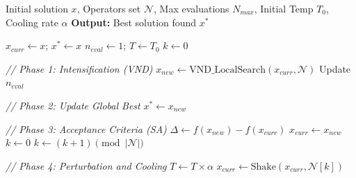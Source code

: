 \documentclass[preprint,12pt,authoryear]{elsarticle}
\begin{document}
\begin{algorithm}
    \caption{Hybrid VNS with SA Acceptance}
    \label{algoVNS}
    \begin{algorithmic}[1]
    \Require Initial solution $x$, Operators set $\mathcal{N}$, Max evaluations $N_{max}$, Initial Temp $T_0$, Cooling rate $\alpha$
    \State \textbf{Output:} Best solution found $x^*$
    
    \State $x_{curr} \leftarrow x$; \quad $x^* \leftarrow x$
    \State $n_{eval} \leftarrow 1$; \quad $T \leftarrow T_0$
    \State $k \leftarrow 0$ 

        
        \State \textit{// Phase 1: Intensification (VND)}
        \State $x_{new} \leftarrow \text{VND\_LocalSearch}(x_{curr}, \mathcal{N})$ 
        \State Update $n_{eval}$
        
        \State \textit{// Phase 2: Update Global Best}
            \State $x^* \leftarrow x_{new}$
        \EndIf

        \State \textit{// Phase 3: Acceptance Criteria (SA)}
        \State $\Delta \leftarrow f(x_{new}) - f(x_{curr})$
            \State $x_{curr} \leftarrow x_{new}$
            \State $k \leftarrow 0$ 
        \Else
            \State $k \leftarrow (k + 1) \pmod{|\mathcal{N}|}$ 
        \EndIf

        \State \textit{// Phase 4: Perturbation and Cooling}
        \State $T \leftarrow T \times \alpha$
        \State $x_{curr} \leftarrow \text{Shake}(x_{curr}, \mathcal{N}[k])$
        
    \EndWhile
    \end{algorithmic}
\end{algorithm}
\end{document}
